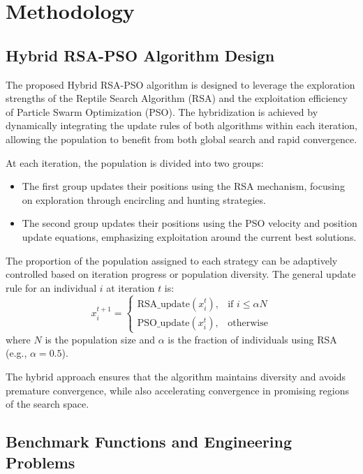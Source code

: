 \documentclass[12pt]{article}
\begin{document}
\section{Methodology}

\subsection{Hybrid RSA-PSO Algorithm Design}

The proposed Hybrid RSA-PSO algorithm is designed to leverage the exploration strengths of the Reptile Search Algorithm (RSA) and the exploitation efficiency of Particle Swarm Optimization (PSO). The hybridization is achieved by dynamically integrating the update rules of both algorithms within each iteration, allowing the population to benefit from both global search and rapid convergence.

At each iteration, the population is divided into two groups:
\begin{itemize}
    \item The first group updates their positions using the RSA mechanism, focusing on exploration through encircling and hunting strategies.
    \item The second group updates their positions using the PSO velocity and position update equations, emphasizing exploitation around the current best solutions.
\end{itemize}

The proportion of the population assigned to each strategy can be adaptively controlled based on iteration progress or population diversity. The general update rule for an individual $i$ at iteration $t$ is:
\begin{equation}
    x_i^{t+1} =
    \begin{cases}
      \text{RSA\_update}(x_i^t), & \text{if } i \leq \alpha N \\
      \text{PSO\_update}(x_i^t), & \text{otherwise}
    \end{cases}
\end{equation}
where $N$ is the population size and $\alpha$ is the fraction of individuals using RSA (e.g., $\alpha=0.5$).

The hybrid approach ensures that the algorithm maintains diversity and avoids premature convergence, while also accelerating convergence in promising regions of the search space.

\subsection{Benchmark Functions and Engineering Problems}
\end{document}
